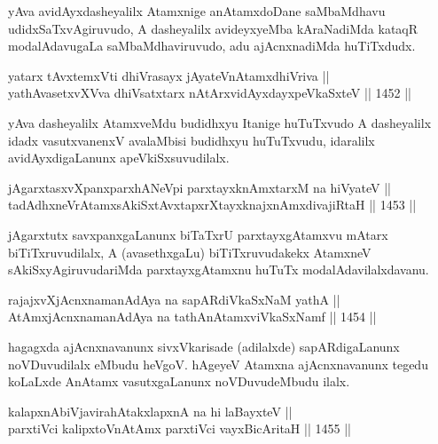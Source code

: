 \begin{artha}
yAva avidAyxdasheyalilx Atamxnige anAtamxdoDane saMbaMdhavu udidxSaTxvAgiruvudo, A dasheyalilx avideyxyeMba kAraNadiMda kataqR modalAdavugaLa saMbaMdhaviruvudo, adu ajAcnxnadiMda huTiTxdudx.
\end{artha}


\begin{shl}
yatarx tAvxtemxVti dhiVrasayx jAyateV\s nAtamxdhiVriva || \\
yathAvasetxvXVva dhiVsatxtarx nAtArxvidAyxdayxpeVkaSxteV \hfill || 1452 ||  
\end{shl}

\begin{artha}
yAva dasheyalilx AtamxveMdu budidhxyu Itanige huTuTxvudo A dasheyalilx idadx vasutxvanenxV avalaMbisi budidhxyu huTuTxvudu, idaralilx avidAyxdigaLanunx apeVkiSxsuvudilalx.
\end{artha}

\begin{shl}
jAgarxtasxvXpanxparxhANeV\s pi parxtayxknAmxtarxM na hiVyateV ||  \\
tadAdhxneVrAtamxsAkiSxtAvxtapxrXtayxknajxnAmxdivajiRtaH \hfill || 1453 ||  
\end{shl}

\begin{artha}
jAgarxtutx savxpanxgaLanunx biTaTxrU parxtayxgAtamxvu mAtarx biTiTxruvudilalx, A (avasethxgaLu) biTiTxruvudakekx AtamxneV sAkiSxyAgiruvudariMda parxtayxgAtamxnu huTuTx modalAdavilalxdavanu.
\end{artha}

\begin{shl}
rajajxvXjAcnxnamanAdAya na sapARdiVkaSxNaM yathA || \\
AtAmxjAcnxnamanAdAya na tathA\s nAtamxviVkaSxNamf \hfill || 1454 ||  
\end{shl}

\begin{artha}
hagagxda ajAcnxnavanunx sivxVkarisade (adilalxde) sapARdigaLanunx noVDuvudilalx eMbudu heVgoV. hAgeyeV Atamxna ajAcnxnavanunx tegedu koLaLxde AnAtamx vasutxgaLanunx noVDuvudeMbudu ilalx.
\end{artha}


\begin{shl}
kalapxnAbiVjavirahAtakxlapxnA na hi laBayxteV ||  \\
parxtiVci kalipxtoV\s nAtAmx parxtiVci vayxBicAritaH \hfill || 1455 ||  
\end{shl}

